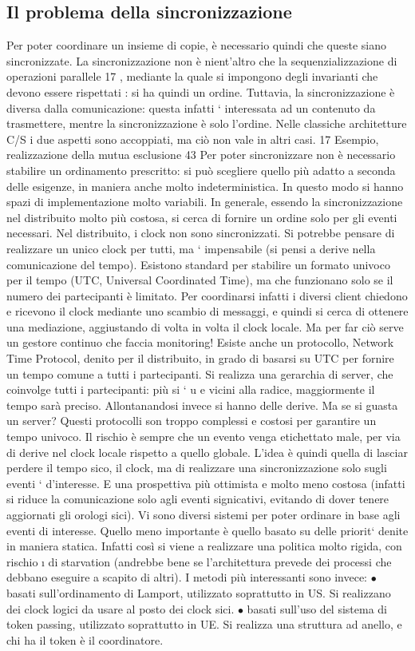 \subsection{Il problema della sincronizzazione}
Per poter coordinare un insieme di copie, è necessario quindi che queste siano
sincronizzate. La sincronizzazione non è nient'altro che la sequenzializzazione
di operazioni parallele 17 , mediante la quale si impongono degli invarianti che
devono essere rispettati : si ha quindi un ordine.
Tuttavia, la sincronizzazione è diversa dalla comunicazione: questa infatti
` interessata ad un contenuto da trasmettere, mentre la sincronizzazione è solo
l'ordine. Nelle classiche architetture C/S i due aspetti sono accoppiati, ma ciò
non vale in altri casi.
17 Esempio,
realizzazione della mutua esclusione
43
Per poter sincronizzare non è necessario stabilire un ordinamento prescritto:
si può scegliere quello più adatto a seconda delle esigenze, in maniera anche
molto indeterministica. In questo modo si hanno spazi di implementazione
molto variabili. In generale, essendo la sincronizzazione nel distribuito molto
più costosa, si cerca di fornire un ordine solo per gli eventi necessari.
Nel distribuito, i clock non sono sincronizzati. Si potrebbe pensare di realizzare un unico clock per tutti, ma `
impensabile (si pensi a derive nella
comunicazione del tempo). Esistono standard per stabilire un formato univoco per il tempo (UTC, Universal Coordinated
Time), ma che funzionano solo
se il numero dei partecipanti è limitato. Per coordinarsi infatti i diversi client
chiedono e ricevono il clock mediante uno scambio di messaggi, e quindi si cerca
di ottenere una mediazione, aggiustando di volta in volta il clock locale. Ma per
far ciò serve un gestore continuo che faccia monitoring!
Esiste anche un protocollo, Network Time Protocol, denito per il distribuito,
in grado di basarsi su UTC per fornire un tempo comune a tutti i partecipanti.
Si realizza una gerarchia di server, che coinvolge tutti i partecipanti: più si `
u e
vicini alla radice, maggiormente il tempo sarà preciso. Allontanandosi invece si
hanno delle derive. Ma se si guasta un server?
Questi protocolli son troppo complessi e costosi per garantire un tempo univoco. Il rischio è sempre che un evento venga
etichettato male, per via di derive
nel clock locale rispetto a quello globale. L'idea è quindi quella di lasciar perdere
il tempo sico, il clock, ma di realizzare una sincronizzazione solo sugli eventi
`
d'interesse. E una prospettiva più ottimista e molto meno costosa (infatti si
riduce la comunicazione solo agli eventi signicativi, evitando di dover tenere
aggiornati gli orologi sici).
Vi sono diversi sistemi per poter ordinare in base agli eventi di interesse.
Quello meno importante è quello basato su delle priorit` denite in maniera
statica. Infatti così si viene a realizzare una politica molto rigida, con rischio
\i{}
di starvation (andrebbe bene se l'architettura prevede dei processi che debbano
eseguire a scapito di altri).
I metodi più interessanti sono invece:
$\bullet$ basati sull'ordinamento di Lamport, utilizzato soprattutto in US. Si realizzano dei clock logici da usare al
posto dei clock sici.
$\bullet$ basati sull'uso del sistema di token passing, utilizzato soprattutto in UE.
Si realizza una struttura ad anello, e chi ha il token è il coordinatore.
